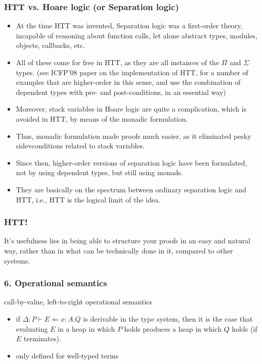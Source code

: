 \documentclass[xcolor=dvipsnames,9pt,hide notes,mathserif]{beamer}
\begin{document}
\begin{frame}
  \frametitle{HTT vs. Hoare logic (or Separation logic)}
  \begin{itemize} 
 \item At the time HTT was invented, Separation logic was a
   first-order theory, incapable of reasoning about function calls,
   let alone abstract types, modules, objects, callbacks, etc.
\item  All of these come for free in HTT, as they are all instances of
  the $\Pi$ and $\Sigma$ types. (see ICFP'08 paper on the
  implementation of HTT, for a number of examples that are
  higher-order in this sense, and use the combination of dependent
  types with pre- and post-conditions, in an essential way)
\item Moreover, stack variables in Hoare logic are quite a
  complication, which is avoided in HTT, by means of the monadic
  formulation. 
\item Thus, monadic formulation made proofs much easier, as it
  eliminated pesky sidevconditions related to stack variables. 
\item Since then, higher-order versions of separation logic have been
  formulated, not by using dependent types, but still using monads. 
\item They are basically on the spectrum between ordinary separation
  logic and HTT, i.e., HTT is the logical limit of the idea. 
  \end{itemize}
\end{frame}





\begin{frame}
  \frametitle{HTT!}
It's usefulness lies in being able to structure your proofs in an easy and natural way, rather than in what can be technically done in it, compared to other systems.
\end{frame}





\begin{frame}
  \frametitle{6. Operational semantics}
call-by-value, left-to-right operational semantics
\vskip1cm
  \begin{itemize}
  \item if $\Delta; P \vdash E \Leftarrow x{:}A. Q$ is derivable in
    the type system, then it is the case that evaluating $E$ in a heap
    in which $P$ holds produces a heap in which $Q$ holds (if $E$ terminates).
    \item only defined for well-typed terms
  \end{itemize}
\end{frame}
\end{document}
